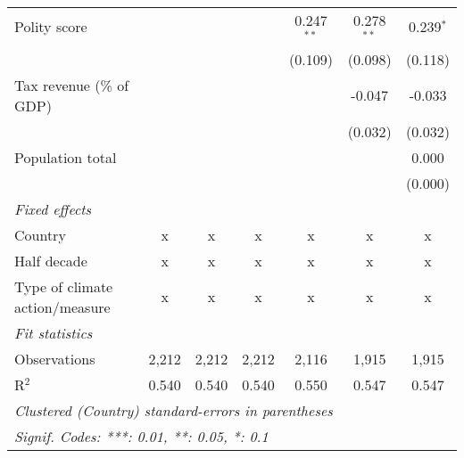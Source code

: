 \begin{tabular}{lcccccc}
   Polity score                                                              &         &         &              & 0.247$^{**}$   & 0.278$^{**}$   & 0.239$^{*}$\\   
                                                                             &         &         &              & (0.109)        & (0.098)        & (0.118)\\   
   Tax revenue (\% of GDP)                                                   &         &         &              &                & -0.047         & -0.033\\   
                                                                             &         &         &              &                & (0.032)        & (0.032)\\   
   Population total                                                          &         &         &              &                &                & 0.000\\   
                                                                             &         &         &              &                &                & (0.000)\\   
   \emph{Fixed effects}\\
   Country                                                                   & x       & x       & x            & x              & x              & x\\  
   Half decade                                                               & x       & x       & x            & x              & x              & x\\  
   Type of climate action/measure                                            & x       & x       & x            & x              & x              & x\\  
   \midrule \emph{Fit statistics}\\
   Observations                                                              & 2,212   & 2,212   & 2,212        & 2,116          & 1,915          & 1,915\\  
   R$^2$                                                                     & 0.540   & 0.540   & 0.540        & 0.550          & 0.547          & 0.547\\  
   \midrule
   \multicolumn{7}{l}{\emph{Clustered (Country) standard-errors in parentheses}}\\
   \multicolumn{7}{l}{\emph{Signif. Codes: ***: 0.01, **: 0.05, *: 0.1}}\\
\end{tabular}
\par\endgroup


